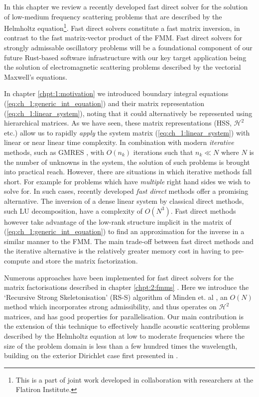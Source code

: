 In this chapter we review a recently developed fast direct solver for the solution of low-medium frequency scattering problems that are described by the Helmholtz equation\footnote{This is a part of joint work developed in collaboration with researchers at the Flatiron Institute.}. Fast direct solvers constitute a fast matrix inversion, in contrast to the fast matrix-vector product of the FMM. Fast direct solvers for strongly admissable oscillatory problems will be a foundational component of our future Rust-based software infrastructure with our key target application being the solution of electromagnetic scattering problems described by the vectorial Maxwell's equations.

In chapter \ref{chpt:1:motivation} we introduced boundary integral equations (\ref{eq:ch_1:generic_int_equation}) and their matrix representation (\ref{eq:ch_1:linear_system}), noting that it could alternatively be represented using hierarchical matrices. As we have seen, these matrix representations (HSS, $\mathcal{H}^2$ etc.) allow us to rapidly \textit{apply} the system matrix (\ref{eq:ch_1:linear_system}) with linear or near linear time complexity. In combination with modern \textit{iterative} methods, such as GMRES \cite{saad1986gmres}, with $O(n_k)$ iterations such that $n_k \ll N$ where $N$ is the number of unknowns in the system, the solution of such problems is brought into practical reach. However, there are situations in which iterative methods fall short. For example for problems which have \textit{multiple} right hand sides we wish to solve for. In such cases, recently developed \textit{fast direct} methods offer a promising alternative. The inversion of a dense linear system by classical direct methods, such LU decomposition, have a complexity of $O(N^3)$. Fast direct methods however take advantage of the low-rank structure implicit in the matrix of (\ref{eq:ch_1:generic_int_equation}) to find an approximation for the inverse in a similar manner to the FMM. The main trade-off between fast direct methods and the iterative alternative is the relatively greater memory cost in having to pre-compute and store the matrix factorization.

Numerous approaches have been implemented for fast direct solvers for the matrix factorisations described in chapter \ref{chpt:2:fmms} \cite{martinsson2005fast, ambikasaran2013mathcal, ambikasaran2014inverse,ho2012fast,minden2017recursive}. Here we introduce the `Recursive Strong Skeletonisation' (RS-S) algorithm of Minden et. al \cite{minden2017recursive}, an $O(N)$ method which incorporates strong admissibility, and thus operates on $\mathcal{H}^2$ matrices, and has good properties for parallelisation. Our main contribution is the extension of this technique to effectively handle acoustic scattering problems described by the Helmholtz equation at low to moderate frequencies where the size of the problem domain is less than a few hundred times the wavelength, building on the exterior Dirichlet case first presented in \cite{sushnikova2022fmm}. 

